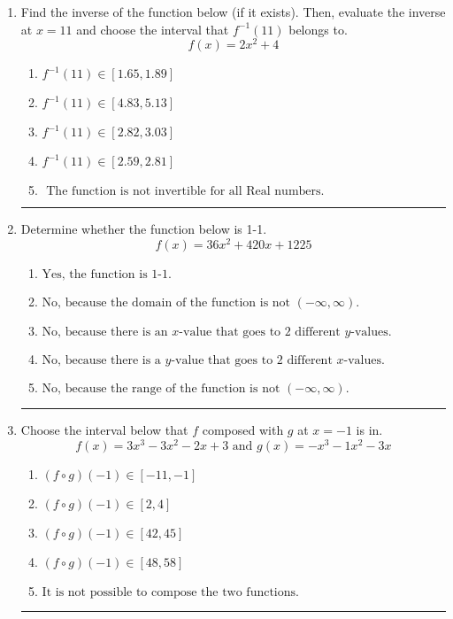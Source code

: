\documentclass[14pt]{extbook}
\newcommand{\litem}[1]{\item#1\hspace*{-1cm}\rule{\textwidth}{0.4pt}}
\begin{document}
\begin{enumerate}
\litem{
Find the inverse of the function below (if it exists). Then, evaluate the inverse at $x = 11$ and choose the interval that $f^{-1}(11)$ belongs to.\[ f(x) = 2 x^2 + 4 \]\begin{enumerate}[label=\Alph*.]
\item \( f^{-1}(11) \in [1.65, 1.89] \)
\item \( f^{-1}(11) \in [4.83, 5.13] \)
\item \( f^{-1}(11) \in [2.82, 3.03] \)
\item \( f^{-1}(11) \in [2.59, 2.81] \)
\item \( \text{ The function is not invertible for all Real numbers. } \)

\end{enumerate} }
\litem{
Determine whether the function below is 1-1.\[ f(x) = 36 x^2 + 420 x + 1225 \]\begin{enumerate}[label=\Alph*.]
\item \( \text{Yes, the function is 1-1.} \)
\item \( \text{No, because the domain of the function is not $(-\infty, \infty)$.} \)
\item \( \text{No, because there is an $x$-value that goes to 2 different $y$-values.} \)
\item \( \text{No, because there is a $y$-value that goes to 2 different $x$-values.} \)
\item \( \text{No, because the range of the function is not $(-\infty, \infty)$.} \)

\end{enumerate} }
\litem{
Choose the interval below that $f$ composed with $g$ at $x=-1$ is in.\[ f(x) = 3x^{3} -3 x^{2} -2 x + 3 \text{ and } g(x) = -x^{3} -1 x^{2} -3 x \]\begin{enumerate}[label=\Alph*.]
\item \( (f \circ g)(-1) \in [-11, -1] \)
\item \( (f \circ g)(-1) \in [2, 4] \)
\item \( (f \circ g)(-1) \in [42, 45] \)
\item \( (f \circ g)(-1) \in [48, 58] \)
\item \( \text{It is not possible to compose the two functions.} \)


\end{enumerate}}
\end{enumerate}
\end{document}

